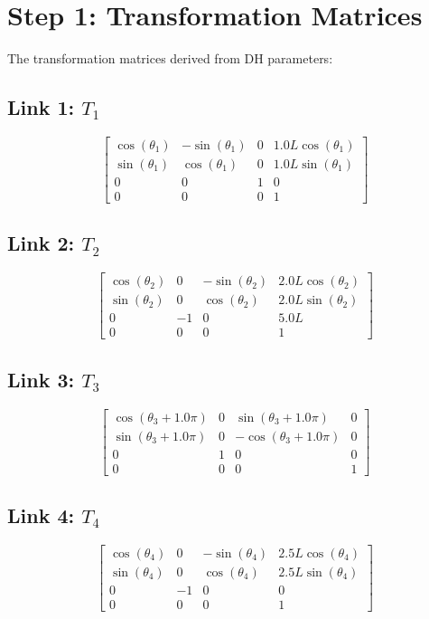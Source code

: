 \section{Step 1: Transformation Matrices}
The transformation matrices derived from DH parameters:
\subsection*{Link 1: $T_{1}$}
\[ \left[\begin{matrix}\cos{\left(\theta_{1} \right)} & - \sin{\left(\theta_{1} \right)} & 0 & 1.0 L \cos{\left(\theta_{1} \right)}\\\sin{\left(\theta_{1} \right)} & \cos{\left(\theta_{1} \right)} & 0 & 1.0 L \sin{\left(\theta_{1} \right)}\\0 & 0 & 1 & 0\\0 & 0 & 0 & 1\end{matrix}\right] \]
\subsection*{Link 2: $T_{2}$}
\[ \left[\begin{matrix}\cos{\left(\theta_{2} \right)} & 0 & - \sin{\left(\theta_{2} \right)} & 2.0 L \cos{\left(\theta_{2} \right)}\\\sin{\left(\theta_{2} \right)} & 0 & \cos{\left(\theta_{2} \right)} & 2.0 L \sin{\left(\theta_{2} \right)}\\0 & -1 & 0 & 5.0 L\\0 & 0 & 0 & 1\end{matrix}\right] \]
\subsection*{Link 3: $T_{3}$}
\[ \left[\begin{matrix}\cos{\left(\theta_{3} + 1.0 \pi \right)} & 0 & \sin{\left(\theta_{3} + 1.0 \pi \right)} & 0\\\sin{\left(\theta_{3} + 1.0 \pi \right)} & 0 & - \cos{\left(\theta_{3} + 1.0 \pi \right)} & 0\\0 & 1 & 0 & 0\\0 & 0 & 0 & 1\end{matrix}\right] \]
\subsection*{Link 4: $T_{4}$}
\[ \left[\begin{matrix}\cos{\left(\theta_{4} \right)} & 0 & - \sin{\left(\theta_{4} \right)} & 2.5 L \cos{\left(\theta_{4} \right)}\\\sin{\left(\theta_{4} \right)} & 0 & \cos{\left(\theta_{4} \right)} & 2.5 L \sin{\left(\theta_{4} \right)}\\0 & -1 & 0 & 0\\0 & 0 & 0 & 1\end{matrix}\right] \]
